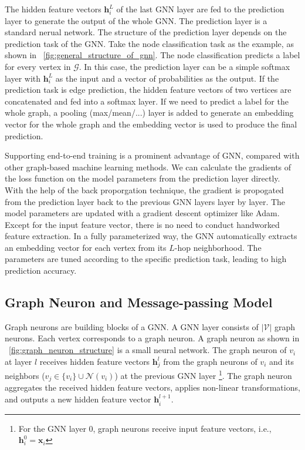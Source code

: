 The hidden feature vectors $\boldsymbol{h}^L_i$ of the last GNN layer are fed to the prediction layer to generate the output of the whole GNN.
The prediction layer is a standard nerual network.
The structure of the prediction layer depends on the prediction task of the GNN.
Take the node classification task as the example, as shown in \figurename~\ref{fig:general_structure_of_gnn}.
The node classification predicts a label for every vertex in $\mathcal{G}$.
In this case, the prediction layer can be a simple softmax layer with $\boldsymbol{h}^L_i$ as the input and a vector of probabilities as the output.
If the prediction task is edge prediction, the hidden feature vectors of two vertices are concatenated and fed into a softmax layer.
If we need to predict a label for the whole graph, a pooling (max/mean/...) layer is added to generate an embedding vector for the whole graph and the embedding vector is used to produce the final prediction.

Supporting end-to-end training is a prominent advantage of GNN, compared with other graph-based machine learning methods.
We can calculate the gradients of the loss function on the model parameters from the prediction layer directly.
With the help of the back proporgation technique, the gradient is propogated from the prediction layer back to the previous GNN layers layer by layer.
The model parameters are updated with a gradient descent optimizer like Adam.
Except for the input feature vector, there is no need to conduct handworked feature extraction.
In a fully parameterized way, the GNN automatically extracts an embedding vector for each vertex from its $L$-hop neighborhood.
The parameters are tuned according to the specific prediction task, leading to high prediction accuracy.

\subsection{Graph Neuron and Message-passing Model}

Graph neurons are building blocks of a GNN.
A GNN layer consists of $|\mathcal{V}|$ graph neurons.
Each vertex corresponds to a graph neuron.
A graph neuron as shown in \figurename~\ref{fig:graph_neuron_structure} is a small neural network.
The graph neuron of $v_i$ at layer $l$ receives hidden feature vectors $\boldsymbol{h}^l_j$ from the graph neurons of $v_i$ and its neighbors ($v_j \in \{v_i\} \cup \mathcal{N}(v_i)$) at the previous GNN layer \footnote{For the GNN layer 0, graph neurons receive input feature vectors, i.e., $\boldsymbol{h}^0_i=\boldsymbol{x}_i$}.
The graph neuron aggregates the received hidden feature vectors, applies non-linear transformations, and outputs a new hidden feature vector $\boldsymbol{h}_i^{l+1}$.

